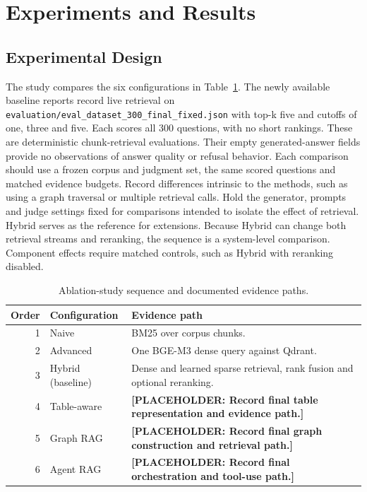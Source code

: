 \documentclass[oneside]{sn-jnl}
\newcommand{\pending}[1]{\textbf{\textcolor{red!65!black}{[PLACEHOLDER: #1]}}}
\newcommand{\artifact}[1]{\nolinkurl{#1}}
\begin{document}
\section{Experiments and Results}

\subsection{Experimental Design}
The study compares the six configurations in Table~\ref{tab:sequence}. The newly available baseline reports record live retrieval on \artifact{evaluation/eval_dataset_300_final_fixed.json} with top-k five and cutoffs of one, three and five. Each scores all 300 questions, with no short rankings. These are deterministic chunk-retrieval evaluations. Their empty generated-answer fields provide no observations of answer quality or refusal behavior. Each comparison should use a frozen corpus and judgment set, the same scored questions and matched evidence budgets. Record differences intrinsic to the methods, such as using a graph traversal or multiple retrieval calls. Hold the generator, prompts and judge settings fixed for comparisons intended to isolate the effect of retrieval. Hybrid serves as the reference for extensions. Because Hybrid can change both retrieval streams and reranking, the sequence is a system-level comparison. Component effects require matched controls, such as Hybrid with reranking disabled.

\begin{table}[htbp]
\centering
\caption{Ablation-study sequence and documented evidence paths.}
\label{tab:sequence}
\begin{tabularx}{\linewidth}{rlX}
\toprule
Order & Configuration & Evidence path\\
\midrule
1 & Naive & BM25 over corpus chunks.\\
2 & Advanced & One BGE-M3 dense query against Qdrant.\\
3 & Hybrid (baseline) & Dense and learned sparse retrieval, rank fusion and optional reranking.\\
4 & Table-aware & \pending{Record final table representation and evidence path.}\\
5 & Graph RAG & \pending{Record final graph construction and retrieval path.}\\
6 & Agent RAG & \pending{Record final orchestration and tool-use path.}\\
\bottomrule
\end{tabularx}
\end{table}
\end{document}
